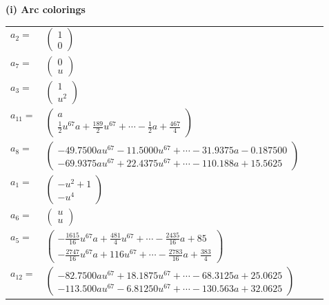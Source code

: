 \documentclass[1p]{elsarticle_modified}
\theoremstyle{definition}
\begin{document}
\flushleft \textbf{(i) Arc colorings}\\
\begin{tabular}{m{7pt} m{180pt} m{7pt} m{180pt} }
\flushright $a_{2}=$&$\begin{pmatrix}1\\0\end{pmatrix}$ \\
\flushright $a_{7}=$&$\begin{pmatrix}0\\u\end{pmatrix}$ \\
\flushright $a_{3}=$&$\begin{pmatrix}1\\u^2\end{pmatrix}$ \\
\flushright $a_{11}=$&$\begin{pmatrix}a\\\frac{1}{2} u^{67} a+\frac{189}{2} u^{67}+\cdots-\frac{1}{2} a+\frac{467}{4}\end{pmatrix}$ \\
\flushright $a_{8}=$&$\begin{pmatrix}-49.7500 a u^{67}-11.5000 u^{67}+\cdots-31.9375 a-0.187500\\-69.9375 a u^{67}+22.4375 u^{67}+\cdots-110.188 a+15.5625\end{pmatrix}$ \\
\flushright $a_{1}=$&$\begin{pmatrix}- u^2+1\\- u^4\end{pmatrix}$ \\
\flushright $a_{6}=$&$\begin{pmatrix}u\\u\end{pmatrix}$ \\
\flushright $a_{5}=$&$\begin{pmatrix}-\frac{1615}{16} u^{67} a+\frac{481}{4} u^{67}+\cdots-\frac{2435}{16} a+85\\-\frac{2747}{16} u^{67} a+116 u^{67}+\cdots-\frac{2783}{16} a+\frac{383}{4}\end{pmatrix}$ \\
\flushright $a_{12}=$&$\begin{pmatrix}-82.7500 a u^{67}+18.1875 u^{67}+\cdots-68.3125 a+25.0625\\-113.500 a u^{67}-6.81250 u^{67}+\cdots-130.563 a+32.0625\end{pmatrix}$ \\

\end{tabular}
\end{document}
